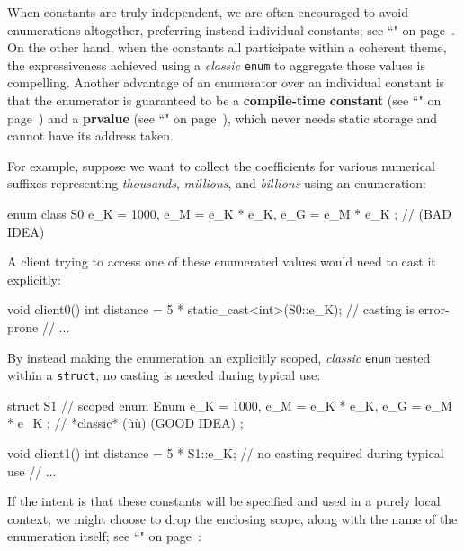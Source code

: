When constants are truly independent, we are often encouraged to avoid
enumerations altogether, preferring instead individual constants; see
``" on page~\pageref{Default-Member-Initializers}. On the other hand, when the constants all participate within a coherent
theme, the expressiveness achieved using a \emph{classic} \texttt{enum}
to aggregate those values is compelling. Another
advantage of an enumerator over an individual constant is that the
enumerator is guaranteed to be a \textbf{compile-time constant} (see
  ``" on page~\pageref{constexprvar}) and a \textbf{prvalue} (see
  ``" on page~\pageref{Rvalue-References}), which never needs static storage
  and cannot have its address taken.

For example, suppose we want to collect the coefficients for various
numerical suffixes representing \emph{thousands}, \emph{millions}, and
\emph{billions} using an enumeration:

\begin{emcppslisting}
enum class S0 { e_K = 1000, e_M = e_K * e_K, e_G = e_M * e_K };  // (BAD IDEA)
\end{emcppslisting}

\noindent A client trying to access one of these enumerated values would need to
cast it explicitly:

\begin{emcppslisting}
void client0()
{
    int distance = 5 * static_cast<int>(S0::e_K);  // casting is error-prone
    // ...
}
\end{emcppslisting}

\noindent By instead making the enumeration an explicitly scoped, \emph{classic}
\texttt{enum} nested within a \texttt{struct}, no casting is needed
during typical use:

\begin{emcppslisting}
struct S1  // scoped
{
    enum Enum { e_K = 1000, e_M = e_K * e_K, e_G = e_M * e_K };
        // *classic* (ù{}ù) (GOOD IDEA)
};

void client1()
{
    int distance = 5 * S1::e_K;  // no casting required during typical use
    // ...
}
\end{emcppslisting}

\noindent If the intent is that these constants will be specified and used in a
purely local context, we might choose to drop the enclosing scope, along
with the name of the enumeration itself; see ``" on page~\pageref{local-types-as-template-arguments}:

